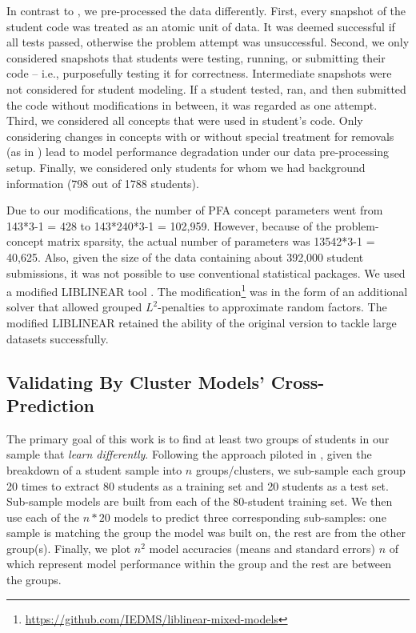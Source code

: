 \documentclass{sigchi}
\begin{document}
In contrast to \cite{yudelson2014investigating}, we pre-processed the data differently. First, every snapshot of the student code was treated as an atomic unit of data. It was deemed successful if all tests passed, otherwise the problem attempt was unsuccessful. Second, we only considered snapshots that students were testing, running, or submitting their code -- i.e., purposefully testing it for correctness. Intermediate snapshots were not considered for student modeling. If a student tested, ran, and then submitted the code without modifications in between, it was regarded as one attempt. Third, we considered all concepts that were used in student's code. Only considering changes in concepts with or without special treatment for removals (as in \cite{yudelson2014investigating}) lead to model performance degradation under our data pre-processing setup. Finally, we considered only students for whom we had background information (798 out of 1788 students).

Due to our modifications, the number of PFA concept parameters went from 143*3-1 = 428 to 143*240*3-1 = 102,959. However, because of the problem-concept matrix sparsity, the actual number of parameters was 13542*3-1 = 40,625. Also, given the size of the data containing about 392,000 student submissions, it was not possible to use conventional statistical packages. We used a modified LIBLINEAR tool \cite{liblinear2008}. The modification\footnote {\url{https://github.com/IEDMS/liblinear-mixed-models}} was in the form of an additional solver that allowed grouped $L^2$-penalties to approximate random factors. The modified LIBLINEAR retained the ability of the original version to tackle large datasets successfully.


\subsection{Validating By Cluster Models' Cross-Prediction}

The primary goal of this work is to find at least two groups of students in our sample that \textit{learn differently}. Following the approach piloted in \cite{yudelson2014bdbbd}, given the breakdown of a student sample into $n$ groups/clusters, we sub-sample each group 20 times to extract 80 students as a training set and 20 students as a test set. Sub-sample models are built from each of the 80-student training set. We then use each of the $n*20$ models to predict three corresponding sub-samples: one sample is matching the group the model was built on, the rest are from the other group(s). Finally, we plot $n^2$ model accuracies (means and standard errors) $n$ of which represent model performance within the group and the rest are between the groups.
\end{document}

